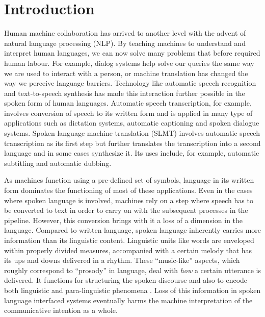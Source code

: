 \chapter{Introduction}
\label{chapter:intro}

Human machine collaboration has arrived to another level with the advent of natural language processing (NLP). By teaching machines to understand and interpret human languages, we can now solve many problems that before required human labour. For example, dialog systems help solve our queries the same way we are used to interact with a person, or machine translation has changed the way we perceive language barriers. Technology like automatic speech recognition and text-to-speech synthesis has made this interaction further possible in the spoken form of human languages. Automatic speech transcription, for example, involves conversion of speech to its written form and is applied in many type of applications such as dictation systems, automatic captioning and spoken dialogue systems. Spoken language machine translation (SLMT) involves automatic speech transcription as its first step but further translates the transcription into a second language and in some cases synthesize it. Its uses include, for example, automatic subtitling and automatic dubbing.

As machines function using a pre-defined set of symbols, language in its written form dominates the functioning of most of these applications. Even in the cases where spoken language is involved, machines rely on a step where speech has to be converted to text in order to carry on with the subsequent processes in the pipeline. However, this conversion brings with it a loss of a dimension in the language. Compared to written language, spoken language inherently carries more information than its linguistic content. Linguistic units like words are enveloped within properly divided measures, accompanied with a certain melody that has its ups and downs delivered in a rhythm. These ``music-like'' aspects, which roughly correspond to ``prosody'' in language, deal with \textit{how} a certain utterance is delivered. It functions for structuring the spoken discourse and also to encode both linguistic and para-linguistic phenomena \citep{fujisaki2004}. Loss of this information in spoken language interfaced systems eventually harms the machine interpretation of the communicative intention as a whole. 

